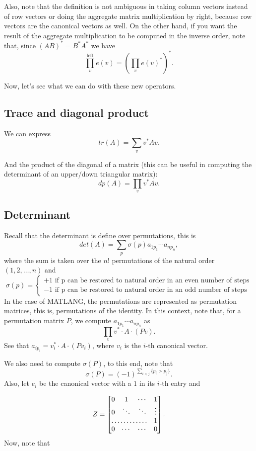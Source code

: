 Also, note that the definition is not ambiguous in taking column vectors instead of row vectors or doing the aggregate matrix multiplication by right, because row vectors are the canonical vectors as well. On the other hand, if you want the result of the aggregate multiplication to be computed in the inverse order, note that, since $(AB)^*=B^*A^*$ we have $$\prod_{v}^{\text{left}}e(v)=\left(\prod_{v}e(v)^*\right)^*.$$

Now, let's see what we can do with these new operators.

\subsection*{Trace and diagonal product}

We can express $$tr(A)=\sum_v v^*Av.$$

And the product of the diagonal of a matrix (this can be useful in computing the determinant of an upper/down triangular matrix): $$dp(A)=\prod_v v^*Av.$$


\subsection*{Determinant}

Recall that the determinant is define over permutations, this is $$det(A)=\sum_{p}\sigma(p)a_{1p_1}\cdots a_{np_n},$$ where the sum is taken over the $n!$ permutations of the natural order $(1, 2,\ldots, n)$ and 
       \[
  			\sigma(p)=\begin{cases}
               +1 \text{ if p can be restored to natural order in an even number of steps} \\
               -1 \text{ if p can be restored to natural order in an odd number of steps}
            \end{cases}
		\]
In the case of MATLANG, the permutations are represented as permutation matrices, this is, permutations of the identity. In this context, note that, for a permutation matrix $P$, we compute $a_{1p_1}\cdots a_{np_n}$ as $$\prod_v v^*\cdot A\cdot (Pv).$$ See that $a_{ip_i}=v_i^*\cdot A\cdot (Pv_i)$, where $v_i$ is the $i$-th canonical vector. 


We also need to compute $\sigma(P)$, to this end, note that $$\sigma(P)=(-1)^{\sum_{i<j}\lbrace p_i>p_j\rbrace}.$$ Also, let $e_i$ be the canonical vector with a $1$ in its $i$-th entry and 

\[
Z = \begin{bmatrix}
    0 & 1 & \cdots &  1 \\
    0 & \ddots & \ddots & \vdots \\
    \hdotsfor{3} & 1 \\
    0 & \cdots & \cdots & 0 
\end{bmatrix}.
\]
Now, note that 

